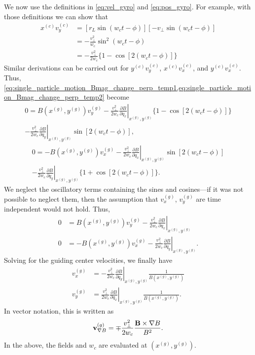 \documentclass[a4paper,11pt]{report}
\begin{document}
We now use the definitions in \cref{eq:vel_gyro} and \cref{eq:pos_gyro}. For example, with those definitions we can show that 
\begin{align}
     x^{(c)} v_y^{(c)} &= \left[ r_L \sin (w_c t - \phi) \right] \left[ -v_\perp \sin (w_ct - \phi) \right] \nonumber \\
    & = -\frac{ v^2_\perp}{w_c} \sin^2(w_c t - \phi) \nonumber \\
    & = -\frac{ v^2_\perp}{2 w_c} \{1 - \cos [ 2 (w_c t - \phi)] \}
\end{align}
Similar derivations can be carried out for $y^{(c)} v_y^{(c)}$, $x^{(c)} v_x^{(c)}$, and $y^{(c)} v_x^{(c)}$. Thus, \cref{eq:single_particle_motion_Bmag_change_perp_temp1,eq:single_particle_motion_Bmag_change_perp_temp2} become 
\begin{multline}
    0 = B(x^{(g)},y^{(g)}) v_y^{(g)} -\frac{ v^2_\perp}{2 w_c} \left . \frac{\partial B}{\partial q_x} \right |_{x^{(g)},y^{(g)}} \{1 - \cos [ 2 (w_c t - \phi)] \} \\
    - \frac{ v^2_\perp}{2 w_c} \left .\frac{\partial B}{\partial q_y} \right |_{x^{(g)},y^{(g)}} \sin [ 2(w_ct - \phi)],
\end{multline}
\begin{multline}
    0 = -B(x^{(g)},y^{(g)}) v_x^{(g)} -\frac{ v^2_\perp}{2 w_c} \left . \frac{\partial B}{\partial q_x} \right |_{x^{(g)},y^{(g)}} \sin [ 2 (w_c t - \phi)] \\
    - \frac{ v^2_\perp}{2 w_c} \left .\frac{\partial B}{\partial q_y} \right |_{x^{(g)},y^{(g)}} \{ 1 + \cos [ 2(w_ct - \phi)] \}.
\end{multline}
We neglect the oscillatory terms containing the sines and cosines---if it was not possible to neglect them, then the assumption that $v^{(g)}_x$, $v^{(g)}_y$ are time independent would not hold. Thus,
\begin{subequations}
\begin{alignat}{2}
    0 &= B(x^{(g)},y^{(g)}) v_y^{(g)} - \frac{ v^2_\perp}{2 w_c} \left . \frac{\partial B}{\partial q_x} \right |_{x^{(g)},y^{(g)}} \nonumber \\
    0 &= -B(x^{(g)},y^{(g)}) v_x^{(g)} -\frac{ v^2_\perp}{2 w_c} \left . \frac{\partial B}{\partial q_y} \right |_{x^{(g)},y^{(g)}} . 
\end{alignat}
\end{subequations}
Solving for the guiding center velocities, we finally have
\begin{align}
    v_x^{(g)} &= -\frac{v^2_\perp}{2 w_c} \left . \frac{\partial B}{\partial q_y} \right |_{x^{(g)},y^{(g)}} \frac{1}{B(x^{(g)},y^{(g)})} \nonumber \\
    v_y^{(g)} &= \frac{v^2_\perp}{2 w_c} \left . \frac{\partial B}{\partial q_x} \right |_{x^{(g)},y^{(g)}} \frac{1}{B(x^{(g)},y^{(g)})} . 
\end{align}
In vector notation, this is written as
\begin{equation}
    \mathbf{v}^{(g)}_{\nabla B} = \mp \frac{v^2_\perp}{2 w_c} \frac{ \mathbf{B} \times \nabla B }{B^2}.
\end{equation}
In the above, the fields and $w_c$ are evaluated at $(x^{(g)},y^{(g)})$.
\end{document}
